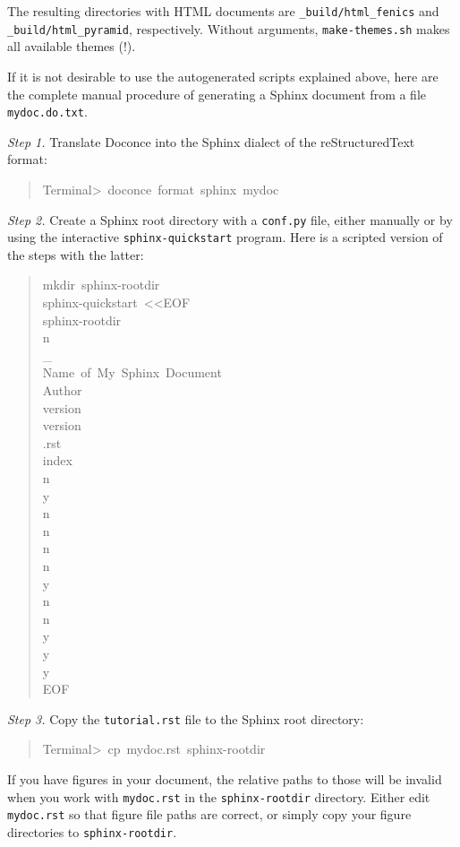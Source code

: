 \documentclass[a4paper]{article}
\begin{document}
The resulting directories with HTML documents are \texttt{\_build/html\_fenics}
and \texttt{\_build/html\_pyramid}, respectively. Without arguments,
\texttt{make-themes.sh} makes all available themes (!).

If it is not desirable to use the autogenerated scripts explained
above, here are the complete manual procedure of generating a
Sphinx document from a file \texttt{mydoc.do.txt}.

\emph{Step 1.} Translate Doconce into the Sphinx dialect of
the reStructuredText format:
%
\begin{quote}{\ttfamily \raggedright \noindent
Terminal>~doconce~format~sphinx~mydoc
}
\end{quote}

\emph{Step 2.} Create a Sphinx root directory with a \texttt{conf.py} file,
either manually or by using the interactive \texttt{sphinx-quickstart}
program. Here is a scripted version of the steps with the latter:
%
\begin{quote}{\ttfamily \raggedright \noindent
mkdir~sphinx-rootdir\\
sphinx-quickstart~<{}<EOF\\
sphinx-rootdir\\
n\\
\_\\
Name~of~My~Sphinx~Document\\
Author\\
version\\
version\\
.rst\\
index\\
n\\
y\\
n\\
n\\
n\\
n\\
y\\
n\\
n\\
y\\
y\\
y\\
EOF
}
\end{quote}

\emph{Step 3.} Copy the \texttt{tutorial.rst} file to the Sphinx root directory:
%
\begin{quote}{\ttfamily \raggedright \noindent
Terminal>~cp~mydoc.rst~sphinx-rootdir
}
\end{quote}

If you have figures in your document, the relative paths to those will
be invalid when you work with \texttt{mydoc.rst} in the \texttt{sphinx-rootdir}
directory. Either edit \texttt{mydoc.rst} so that figure file paths are correct,
or simply copy your figure directories to \texttt{sphinx-rootdir}.
\end{document}

